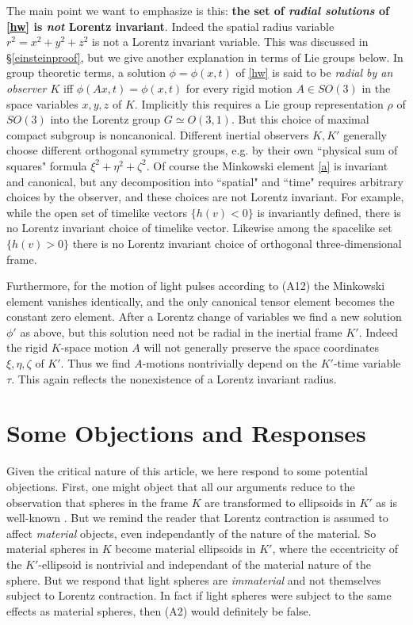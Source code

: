 \documentclass[12pt]{amsart}
\begin{document}
The main point we want to emphasize is this: \textbf{the set of \emph{radial solutions} of \eqref{hw} is \emph{not} Lorentz invariant}. Indeed the spatial radius variable $r^2=x^2+y^2+z^2$ is not a Lorentz invariant variable. This was discussed in \S\ref{einsteinproof}, but we give another explanation in terms of Lie groups below. In group theoretic terms, a solution $\phi=\phi(x,t)$ of \eqref{hw} is said to be \emph{radial by an observer $K$} iff $\phi(Ax,t)=\phi(x,t)$ for every rigid motion $A\in SO(3)$ in the space variables $x,y,z$ of $K$. Implicitly this requires a Lie group representation $\rho$ of $SO(3)$ into the Lorentz group $G\simeq O(3,1)$. But this choice of maximal compact subgroup is noncanonical. Different inertial observers $K, K'$ generally choose different orthogonal symmetry groups, e.g. by their own ``physical sum of squares" formula $\xi^2+\eta^2+\zeta^2$. Of course the Minkowski element \eqref{a} is invariant and canonical, but any decomposition into ``spatial" and ``time" requires arbitrary choices by the observer, and these choices are not Lorentz invariant. For example, while the open set of timelike vectors $\{h(v)<0\}$ is invariantly defined, there is no Lorentz invariant choice of timelike vector. Likewise among the spacelike set $\{h(v)>0\}$ there is no Lorentz invariant choice of orthogonal three-dimensional frame. 

Furthermore, for the motion of light pulses according to (A12) the Minkowski element vanishes identically, and the only canonical tensor element becomes the constant zero element. After a Lorentz change of variables we find a new solution $\phi'$ as above, but this solution need not be radial in the inertial frame $K'$. Indeed the rigid $K$-space motion $A$ will not generally preserve the space coordinates $\xi, \eta, \zeta$ of $K'$. Thus we find $A$-motions nontrivially depend on the $K'$-time variable $\tau$. This again reflects the nonexistence of a Lorentz invariant radius.








\section{Some Objections and Responses}\label{objections}
Given the critical nature of this article, we here respond to some potential objections. First, one might object that all our arguments reduce to the observation that spheres in the frame $K$ are transformed to ellipsoids in $K'$ as is well-known \cite[\S 4]{einstein1905electrodynamics}. But we remind the reader that Lorentz contraction is assumed to affect \emph{material} objects, even independantly of the nature of the material. So material spheres in $K$ become material ellipsoids in $K'$, where the eccentricity of the $K'$-ellipsoid is nontrivial and independant of the material nature of the sphere. But we respond that light spheres are \emph{immaterial} and not themselves subject to Lorentz contraction. In fact if light spheres were subject to the same effects as material spheres, then (A2) would definitely be false.
\end{document}
